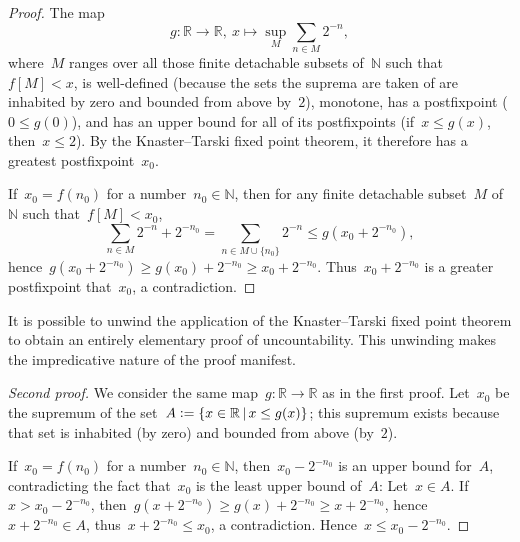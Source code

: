 \documentclass[oneside]{amsart}
\newcommand{\NN}{\mathbb{N}}
\newcommand{\RR}{\mathbb{R}}
\theoremstyle{definition}
\theoremstyle{plain}
\theoremstyle{remark}
\newcommand{\defeq}{\vcentcolon=}
\begin{document}
\begin{proof}The map
\[ g : \RR \longrightarrow \RR,\
  x \longmapsto \sup_M \sum_{n \in M} 2^{-n}, \]
where~$M$ ranges over all those finite detachable subsets of~$\NN$ such
that~$f[M] < x$, is well-defined (because the sets the suprema are taken of are
inhabited by zero and bounded from above by~$2$), monotone, has a postfixpoint
($0 \leq g(0)$), and has an upper bound for all of its postfixpoints (if~$x
\leq g(x)$, then~$x \leq 2$). By the Knaster--Tarski fixed point theorem, it
therefore has a greatest postfixpoint~$x_0$.

If~$x_0 = f(n_0)$ for a number~$n_0 \in \NN$, then for any finite detachable
subset~$M$ of~$\NN$ such that~$f[M] < x_0$,
\[ \sum_{n \in M} 2^{-n} + 2^{-n_0} = \sum_{n \in M \cup \{n_0\}} 2^{-n}
  \leq g(x_0 + 2^{-n_0}), \]
hence~$g(x_0 + 2^{-n_0}) \geq g(x_0) + 2^{-n_0} \geq x_0 + 2^{-n_0}$.
Thus~$x_0 + 2^{-n_0}$ is a greater postfixpoint that~$x_0$, a contradiction.
\end{proof}

It is possible to unwind the application of the Knaster--Tarski fixed point
theorem to obtain an entirely elementary proof of uncountability. This
unwinding makes the impredicative nature of the proof manifest.

\begin{proof}[Second proof]We consider the same map~$g : \RR \to \RR$ as in the
first proof. Let~$x_0$ be the supremum of the set~$A \defeq \{ x \in \RR \,|\,
x \leq g(x) \}$; this supremum exists because that set is inhabited (by zero)
and bounded from above (by~$2$).

If~$x_0 = f(n_0)$ for a number~$n_0 \in \NN$, then~$x_0 - 2^{-n_0}$ is an
upper bound for~$A$, contradicting the fact that~$x_0$ is the least upper bound
of~$A$: Let~$x \in A$. If~$x > x_0 - 2^{-n_0}$, then~$g(x +
2^{-n_0}) \geq g(x) + 2^{-n_0} \geq x + 2^{-n_0}$, hence~$x + 2^{-n_0} \in A$,
thus~$x + 2^{-n_0} \leq x_0$, a contradiction. Hence~$x \leq x_0 - 2^{-n_0}$.
\end{proof}
\end{document}
